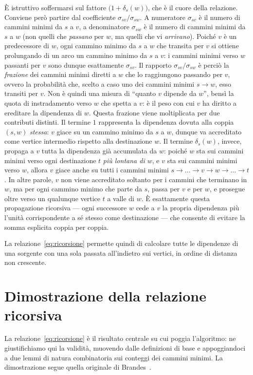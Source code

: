 \documentclass[11pt,a4paper]{report}
\begin{document}
È istruttivo soffermarsi sul fattore $\bigl(1+\delta_s(w)\bigr)$, che è il cuore
della relazione. Conviene però partire dal coefficiente
$\sigma_{sv}/\sigma_{sw}$. A numeratore $\sigma_{sv}$ è il numero di cammini
minimi da $s$ a $v$, a denominatore $\sigma_{sw}$ è il numero di cammini minimi
da $s$ a $w$ (non quelli che \emph{passano} per $w$, ma quelli che vi
\emph{arrivano}). Poiché $v$ è un predecessore di $w$, ogni cammino minimo da $s$
a $w$ che transita per $v$ si ottiene prolungando di un arco un cammino minimo da
$s$ a $v$: i cammini minimi verso $w$ passanti per $v$ sono dunque esattamente
$\sigma_{sv}$. Il rapporto $\sigma_{sv}/\sigma_{sw}$ è perciò la \emph{frazione}
dei cammini minimi diretti a $w$ che lo raggiungono passando per $v$, ovvero la
probabilità che, scelto a caso uno dei cammini minimi $s\to w$, esso transiti per
$v$. Non è quindi una misura di ``quanto $v$ dipende da $w$'', bensì la quota di
instradamento verso $w$ che spetta a $v$: è il peso con cui $v$ ha diritto a
ereditare la dipendenza di $w$. Questa frazione viene
moltiplicata per due contributi distinti. Il termine $1$ rappresenta la
dipendenza dovuta alla coppia $(s,w)$ \emph{stessa}: $v$ giace su un cammino
minimo da $s$ a $w$, dunque va accreditato come vertice intermedio rispetto alla
destinazione $w$. Il termine $\delta_s(w)$, invece, propaga a $v$ tutta la
dipendenza già accumulata da $w$: poiché $w$ sta sui cammini minimi verso ogni
destinazione $t$ \emph{più lontana di $w$}, e $v$ sta sui cammini minimi verso
$w$, allora $v$ giace anche su tutti i cammini minimi $s\to\dots\to v\to
w\to\dots\to t$. In altre parole, $v$ non viene accreditato soltanto per i
cammini che terminano in $w$, ma per ogni cammino minimo che parte da $s$, passa
per $v$ e per $w$, e prosegue oltre verso un qualunque vertice $t$ a valle di
$w$. È esattamente questa propagazione ricorsiva --- ogni successore $w$ cede a
$v$ la propria dipendenza più l'unità corrispondente a sé stesso come
destinazione --- che consente di evitare la somma esplicita coppia per coppia.

La relazione~\eqref{eq:ricorsione} permette quindi di calcolare
tutte le dipendenze di una sorgente con una sola passata all'indietro sui
vertici, in ordine di distanza non crescente.

\section{Dimostrazione della relazione ricorsiva}

La relazione~\eqref{eq:ricorsione} è il risultato centrale su cui poggia
l'algoritmo: ne giustifichiamo qui la validità, muovendo dalle definizioni di
base e appoggiandoci a due lemmi di natura combinatoria sui conteggi dei cammini
minimi. La dimostrazione segue quella originale di Brandes~\cite{brandes2001}.
\end{document}
